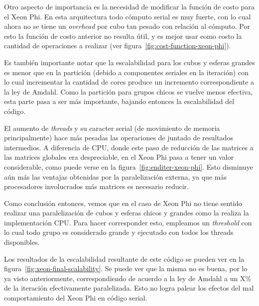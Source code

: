 Otro aspecto de importancia es la necesidad de modificar la funci\'on de costo
para el Xeon Phi. En esta arquitectura todo c\'omputo serial es muy fuerte, con
lo cual ahora no se tiene un \textit{overhead} por cubo tan pesado con relaci\'on
al c\'omputo. Por esto la funci\'on de costo anterior no resulta \'util, y es
mejor usar como costo la cantidad de operaciones a realizar (ver figura~\ref{fig:cost-function-xeon-phi}).

Es tambi\'en importante notar que la escalabilidad para los cubos
y esferas grandes es menor que en la partici\'on (debido a componentes seriales
en la iteraci\'on) con lo cual incrementar la cantidad de cores produce un
incremento correspondiente a la ley de Amdahl. Como la partici\'on para grupos
chicos se vuelve menos efectiva, esta parte pasa a ser m\'as importante, bajando
entonces la escalabilidad del c\'odigo.

El aumento de \textit{threads} y su caracter serial (de movimiento de memoria
principalmente) hace m\'as pesadas las operaciones de juntado de resultados intermedios.
A diferencia de CPU, donde este paso de reducci\'on de las matrices a las matrices
globales era despreciable, en el Xeon Phi pasa a tener un valor considerable, como
puede verse en la figura~\ref{fig:enditer-xeon-phi}. Esto disminuye a\'un m\'as
las ventajas obtenidas por la paralelizaci\'on externa, ya que m\'as procesadores
involucrados m\'as matrices es necesario reducir.

Como conclusi\'on entonces, vemos que en el caso de Xeon Phi no tiene sentido
realizar una paralelizaci\'on de cubos y esferas chicos y grandes como la realiza
la implementaci\'on CPU. Para hacer corresponder esto, empleamos un \textit{threshold}
con lo cual todo grupo es considerado grande y ejecutado con todos los
threads disponibles.

Los resultados de la escalabilidad resultante de este c\'odigo se pueden ver
en la figura~\ref{fig:xeon-final-scalability}. Se puede ver que la misma no es
buena, por lo ya visto anteriormente, correspondiendo de acuerdo a la ley de Amdahl
a un X\% de la iteraci\'on efectivamente paralelizada. Esto no logra palear los
efectos del mal comportamiento del Xeon Phi en c\'odigo serial.
